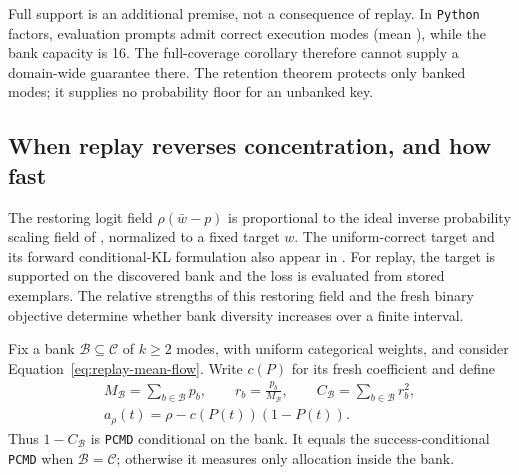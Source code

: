 \documentclass{article}
\newcommand{\1}{\mathbf 1}
\newcommand{\pmd}{\texttt{PCMD}}
\theoremstyle{remark}
\theoremstyle{definition}
\theoremstyle{plain}
\begin{document}
Full support is an additional premise, not a consequence of replay. In
\texttt{Python} factors, evaluation prompts admit \MDvmPythonRange{} correct execution
modes (mean \MDvmPythonMean{}), while the bank capacity is 16. The
full-coverage corollary therefore cannot supply a domain-wide guarantee there. The retention theorem protects only
banked modes; it supplies no probability floor for an unbanked key.

\subsection{When replay reverses concentration, and how fast}
\label{app:theory-replay-finite-horizon}

The restoring logit field $\rho(\bar w-p)$ is proportional to the ideal
inverse probability scaling field of
\citet[Theorem~4.1, v1]{sinha2026expected}, normalized to a fixed target $w$.
The uniform-correct target and its forward conditional-KL formulation also
appear in \citet[Sections~5.2 and~6.2, v1]{lochab2026ucpo}. For replay, the target is
supported on the discovered bank and the loss is evaluated from stored
exemplars. The relative strengths of this restoring field and the fresh
binary objective determine whether bank diversity increases over a finite
interval.

Fix a bank $\mathcal B\subseteq\mathcal C$ of $k\ge2$ modes, with uniform
categorical weights, and consider Equation~\eqref{eq:replay-mean-flow}.
Write $c(P)$ for its fresh coefficient and define
\begin{equation}
 \begin{gathered}
 M_{\mathcal B}=\sum_{b\in\mathcal B}p_b,\qquad
 r_b=\frac{p_b}{M_{\mathcal B}},\qquad
 C_{\mathcal B}=\sum_{b\in\mathcal B}r_b^2,\\
 a_\rho(t)=\rho-c(P(t))(1-P(t)).
 \end{gathered}
 \label{eq:replay-finite-notation}
\end{equation}
Thus $1-C_{\mathcal B}$ is \pmd{} conditional on the bank. It equals the
success-conditional \pmd{} when $\mathcal B=\mathcal C$; otherwise
it measures only allocation inside the bank.
\end{document}
